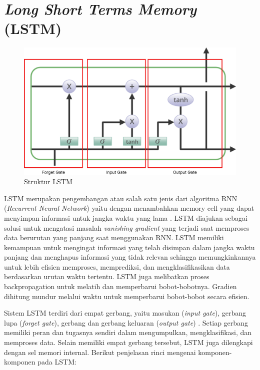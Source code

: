 \section{\emph{Long Short Terms Memory} (LSTM)}

\begin{figure} [H] \centering
  \includegraphics[scale=0.2]{gambar/LSTM.png}
  \caption{Struktur LSTM}
  \label{fig:LSTM}
\end{figure}

LSTM merupakan pengembangan atau salah satu jenis dari algoritma RNN
(\emph{Recurrent Neural Network}) yaitu dengan menambahkan memory cell yang dapat menyimpan
informasi untuk jangka waktu yang lama \parencite{26}. LSTM diajukan sebagai solusi
untuk mengatasi masalah \emph{vanishing gradient} yang terjadi saat memproses data berurutan
yang panjang saat menggunakan RNN. LSTM memiliki kemampuan untuk mengingat informasi
yang telah disimpan dalam jangka waktu panjang dan menghapus informasi yang tidak
relevan sehingga memungkinkannya untuk lebih efisien memproses, memprediksi, dan mengklasifikasikan
data berdasarkan urutan waktu tertentu. LSTM juga melibatkan proses backpropagation untuk melatih dan
memperbarui bobot-bobotnya. Gradien dihitung mundur melalui waktu untuk memperbarui bobot-bobot secara efisien.

Sistem LSTM terdiri dari empat gerbang, yaitu masukan (\emph{input gate}), gerbang
lupa (\emph{forget gate}), gerbang dan gerbang keluaran (\emph{output gate}) \parencite{27}.
Setiap gerbang memiliki peran dan tugasnya sendiri dalam mengumpulkan,
mengklasifikasi, dan memproses data. Selain memiliki empat gerbang tersebut,
LSTM juga dilengkapi dengan sel memori internal. Berikut penjelasan rinci mengenai komponen-komponen
pada LSTM:

